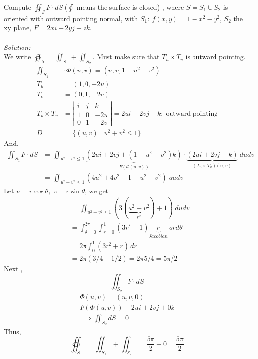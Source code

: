 \documentclass[12pt]{book}
\theoremstyle{definition}
\theoremstyle{remark}
\newcommand\sol{%
  \\ 
  \\
  \textit{Solution:}\\%
}
\begin{document}
\begin{example}Compute $\oiint_S F \cdot  dS$ ($\oint$ means the surface is closed) , where $S = S_1 \cup S_2$ is oriented with outward pointing normal, with $S_1: \; f(x,y) = 1-x^2 -y^2$, $S_2$ the xy plane, $F = 2 x i + 2y j + z k$. 
  \sol 
  We write $\oiint_S = \iint_{S_1} + \iint_{S_2}$. Must make sure that $T_u \times T_v$ is outward pointing. 
  \begin{equation*}
    \begin{split}
      \iint_{S_1}&: \Phi (u,v) = (u,v, 1-u^2-v^2)\\ 
      T_u &= (1, 0, -2u) \\ 
      T_v&= (0,1, -2v) \\ 
      T_u \times T_v &= \left| \begin{matrix}
        i &j & k \\ 1 & 0 & -2u \\ 0 & 1& -2v
      \end{matrix}  \right| = 2ui + 2vj + k: \; \text{outward pointing} \\ 
      D &= \{ (u,v) \mid u^2 + v^2 \leq 1 \}
    \end{split}
  \end{equation*}
  And, 
  \begin{equation*}
    \begin{split}
      \iint_{S_1} F \cdot dS &= \iint_{u^2 + v^2 \leq 1} \underbrace{(2u i + 2v j + ( 1- u^2 - v^2)k) }_{F (\Phi (u,v))}\cdot \underbrace{(2ui + 2vj + k)}_{(T_u \times T_v) (u,v)} \; dudv \\ 
      &= \iint_{u^2 + v^2 \leq 1} ( 4 u^2 + 4v^2 + 1-u^2 -v^2 )\; dudv
    \end{split}
  \end{equation*}
  Let $u = r\cos \theta, $ $v = r \sin \theta$, we get 
  \begin{equation*}
    \begin{split}
      &= \iint_{u^2 + v^2 \leq 1} (3(\underbrace{u^2 + v^2}_{r^2} )+ 1) \; du dv \\ 
      &= \int_{{\theta = 0}}^{{2 \pi}} \int_{{r=0}}^{{1}} (3r^2 + 1)\underbrace{r}_{Jacobian} \: d{r} d{\theta} {} \\ 
      &= 2 \pi \int_{{0}}^{{1}} (3r^2 + r) \: d{r} \\ 
      &= 2 \pi (3/4 + 1/2) = 2 \pi 5/4 = 5\pi /2 
    \end{split}
  \end{equation*}
  Next , $$\iint_{S_2} F \cdot d S  $$
  \begin{equation*}
    \begin{split}
      \Phi (u,v ) = (u,v, 0) \\ 
      F(\Phi (u,v)) - 2 ui + 2vj + 0k\\
      \implies \iint_{S_2} dS = 0
    \end{split}
  \end{equation*}
  Thus, 
  $$\oiint_S = \iint_{S_1} + \iint_{S_2} = \frac{5 \pi}{2}  + 0 =  \frac{5 \pi}{2}  $$
\end{example}
\end{document}
